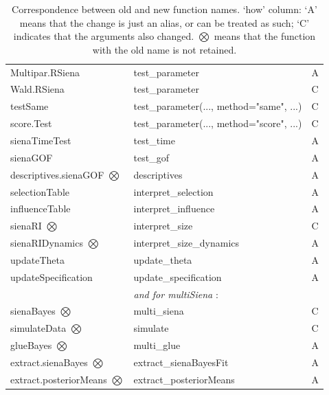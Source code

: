 \documentclass[a4paper,fleqn,11pt]{article}
\newcommand{\+}{\, + \,}
\begin{document}
\begin{table}
\begin{tabular}{lll}
 Multipar.RSiena        & test\_parameter            &  A \\
 Wald.RSiena            & test\_parameter            & C \\
 testSame               & test\_parameter(..., method="same", ...)    & C \\
 score.Test             & test\_parameter(..., method="score", ...)   & C  \\
 sienaTimeTest          & test\_time                 &  A \\
 sienaGOF               & test\_gof                  &  A \\
 descriptives.sienaGOF $\bigotimes$ & descriptives               &  A \\
 selectionTable         & interpret\_selection       &  A \\
 influenceTable         & interpret\_influence       &  A \\
 sienaRI  $\bigotimes$  & interpret\_size            &  C \\
 sienaRIDynamics $\bigotimes$& interpret\_size\_dynamics  &  A   \\
 updateTheta            & update\_theta              &  A \\
 updateSpecification    & update\_specification       &  A \\
\hline                  &
\emph{and for \textsf{multiSiena} } : \\
\hline
 sienaBayes   $\bigotimes$           &  multi\_siena             &  C \\
 simulateData  $\bigotimes$          &  simulate                 &  C  \\
 glueBayes    $\bigotimes$           &  multi\_glue              & A  \\
 extract.sienaBayes $\bigotimes$     & extract\_sienaBayesFit       & A  \\
 extract.posteriorMeans $\bigotimes$ & extract\_posteriorMeans   & A  \\
\hline
\end{tabular}
  \caption{Correspondence between old and new function names.\protect\newline
  `how' column: `A' means that the change is
just an alias, or can be treated as such;  `C'
indicates that the arguments also changed.
 $\bigotimes$ means that the function with the old name is not retained.}
 \label{T_newnames}
\end{table}

\clearpage
\end{document}
